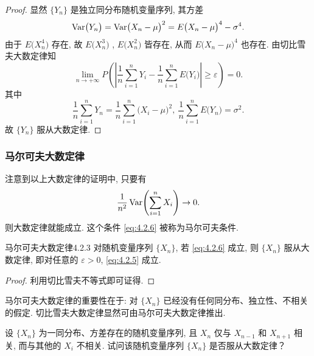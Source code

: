 \begin{proof}
    显然 $ \{ Y_n \} $ 是独立同分布随机变量序列, 其方差
    \begin{equation*}
       \operatorname{Var}  \bigl( Y_n \bigr) =\operatorname{Var}  \bigl( X_n - \mu \bigr)^2 = E \bigl( X_n - \mu \bigr)^4 - \sigma^4.
    \end{equation*}
    由于 $ E \bigl( X_n^4 \bigr) $ 存在, 故 $ E \bigl( X_n^3 \bigr) $ ,  $ E \bigl( X_n^2 \bigr) $ 皆存在, 从而 $ E \bigl( X_n - \mu \bigr)^4 $ 也存在.
    由切比雪夫大数定律知
    \begin{equation*}
        \lim_{n \to +\infty} P \left( \left\lvert \frac{1}{n} \sum_{i=1}^n Y_i - \frac{1}{n} \sum_{i=1}^n E \bigl( Y_i \bigr) \right\rvert \geq \varepsilon \right) = 0.
    \end{equation*}
    其中
    \begin{equation*}
        \frac{1}{n} \sum_{i=1}^n Y_n = \frac{1}{n} \sum_{i=1}^n \bigl( X_i - \mu \bigr)^2, \ \frac{1}{n} \sum_{i=1}^n E \bigl( Y_n \bigr) = \sigma^2.
    \end{equation*}
    故 $ \{ Y_n \} $ 服从大数定律.
\end{proof}

\subsubsection{马尔可夫大数定律}

注意到以上大数定律的证明中, 只要有
\begin{equation*}\label{eq:4.2.6}
    \frac{1}{n^2}\Var  \left( \sum_{i=1}^n X_i \right) \to 0.
\end{equation*}
则大数定律就能成立.
这个条件 \ref{eq:4.2.6} 被称为{\heiti 马尔可夫条件}.

\begin{theorem}{马尔可夫大数定律}{4.2.3}
    对随机变量序列 $ \{ X_n \} $, 若 \ref{eq:4.2.6} 成立, 则 $ \{ X_n \} $ 服从大数定律, 即对任意的 $ \varepsilon > 0 $, \eqref{eq:4.2.5} 成立.
\end{theorem}

\begin{proof}
    利用切比雪夫不等式即可证得.
\end{proof}

马尔可夫大数定律的重要性在于: 对 $ \{ X_n \} $ 已经没有任何同分布、独立性、不相关的假定.
切比雪夫大数定律显然可由马尔可夫大数定律推出.

\begin{example}\label{exam:4.2.3}
    设 $ \{ X_n \} $ 为一同分布、方差存在的随机变量序列, 且 $ X_n $ 仅与 $ X_{n-1} $ 和 $ X_{n+1} $ 相关, 而与其他的 $ X_i $ 不相关.
    试问该随机变量序列 $ \{ X_n \} $ 是否服从大数定律？
\end{example}

